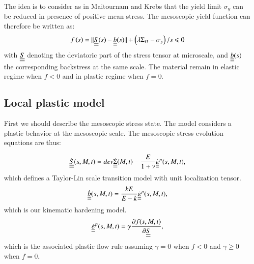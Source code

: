 \documentclass[3p,times,number,review]{elsarticle}
\begin{document}
The idea is to consider as in Maitournam and Krebs\cite{Maitournam2011232} that the yield limit $\sigma_y$ can be reduced in presence of positive mean stress. The mesoscopic yield function can therefore be written as:
\begin{equation}
f\left(s\right)=||\uline{\uline{S}}(s)-\uline{\uline{b}}(s)||+\left( \lambda \Sigma_H-\sigma_y\right) /s\leqslant 0
\label{yieldfun}
\end{equation}
with $\uline{\uline{S}}$ denoting the deviatoric part of the stress tensor at microscale, and $\uline{\uline{b}}(s)$ the corresponding backstress at the same scale. The material remain in elastic regime when $f<0$ and in plastic regime when $f=0$.

\subsection{Local plastic model}
First we should describe the mesoscopic stress state.  The model considers a plastic 
behavior at the mesoscopic scale. The mesoscopic stress evolution equations are thus:

 
	\begin{equation}
    \dot{\uline{\uline{S}}}(s,M,t)=dev\dot{\uline{\uline{\Sigma}}}(M,t)-\dfrac{E}{1+\nu}\dot{\uline{\uline{\varepsilon}}}^p(s,M,t), 
	\end{equation}
     which defines a Taylor-Lin scale transition model with unit localization tensor\cite{Bosia201239}.
		\begin{equation}
		\dot{\uline{\uline{b}}}(s,M,t)=\dfrac{kE}{E-k} \dot{\uline{\uline{\varepsilon}}}^p(s,M,t), 
		\end{equation}
		which is our kinematic hardening model.
		\begin{equation}
		\dot{\uline{\uline{\varepsilon}}}^p(s,M,t)=\gamma\dfrac{\partial f(s,M,t)}{\partial \uline{\uline{S}}}, 
		\end{equation}
		which is the associated plastic flow rule assuming $\gamma=0$ when $f<0$ and  $\gamma\geqslant0$ when $f=0$.
\end{document}
